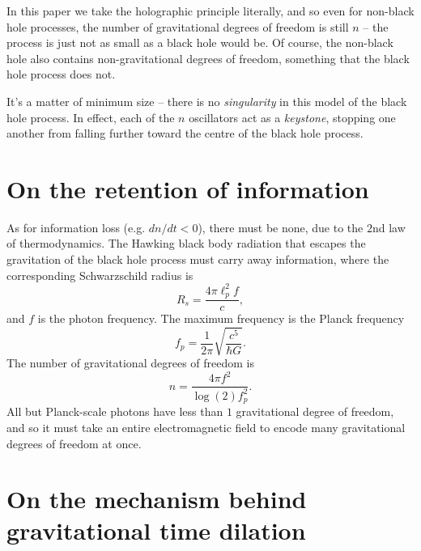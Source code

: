 \documentclass[12pt]{article}
\begin{document}
In this paper we take the holographic principle literally, and so even for non-black hole processes, the number of gravitational degrees of freedom is still $n$ -- the process is just not as small as a black hole would be.
Of course, the non-black hole also contains non-gravitational degrees of freedom, something that the black hole process does not.

It's a matter of minimum size -- there is no {\textit{singularity}} in this model of the black hole process.
In effect, each of the $n$ oscillators act as a {\textit{keystone}}, stopping one another from falling further toward the centre of the black hole process.







\section{On the retention of information}

As for information loss (e.g. $dn / dt < 0$), there must be none, due to the $2$nd law of thermodynamics.
The Hawking black body radiation that escapes the gravitation of the black hole process must carry away information, where the corresponding Schwarzschild radius is
\begin{equation}
R_s = \frac{4 \pi \ell_p^2 f}{c},
\end{equation}
and $f$ is the photon frequency.
The maximum frequency is the Planck frequency
\begin{equation}
f_p = \frac{1}{2 \pi} \sqrt{\frac{c^5}{\hbar G}}.
\end{equation}
The number of gravitational degrees of freedom is
\begin{equation}
n = \frac{4 \pi f^2}{\log(2) f_p^2}.%
\end{equation}
All but Planck-scale photons have less than $1$ gravitational degree of freedom, and so it must take an entire electromagnetic field to encode many gravitational degrees of freedom at once.






\section{On the mechanism behind gravitational time dilation}
\end{document}

